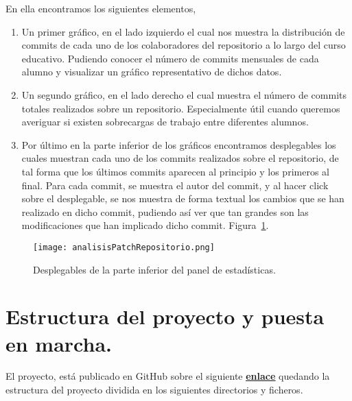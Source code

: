     En ella encontramos los siguientes elementos,
    \begin{enumerate}
      \item Un primer gráfico, en el lado izquierdo el cual nos muestra la distribución de commits de cada uno de los colaboradores del repositorio a lo largo del curso educativo. Pudiendo conocer el número de commits mensuales de cada alumno y visualizar un gráfico representativo de dichos datos.
      \item Un segundo gráfico, en el lado derecho el cual muestra el número de commits totales realizados sobre un repositorio. Especialmente útil cuando queremos averiguar si existen sobrecargas de trabajo entre diferentes alumnos.
      \item Por último en la parte inferior de los gráficos encontramos desplegables los cuales muestran cada uno de los commits realizados sobre el repositorio, de tal forma que los últimos commits aparecen al principio y los primeros al final. Para cada commit, se muestra el autor del commit, y al hacer click sobre el desplegable, se nos muestra de forma textual los cambios que se han realizado en dicho commit, pudiendo así ver que tan grandes son las modificaciones que han implicado dicho commit. Figura~\ref{figure:imagenPatch}.
    \end{enumerate}

    \begin{figure}[h!]
      \texttt{[image: analisisPatchRepositorio.png]}
      \caption{Desplegables de la parte inferior del panel de estadísticas.}
      \label{figure:imagenPatch}
    \end{figure}

\chapter{Estructura del proyecto y puesta en marcha.\label{09EstructuraYpuesta}}

El proyecto, está publicado en GitHub sobre el siguiente \textbf{\href{https://github.com/JuanPedroMartinez/TFG-NODE}{\underline{enlace}}} quedando la estructura del proyecto dividida en los siguientes directorios y ficheros.

